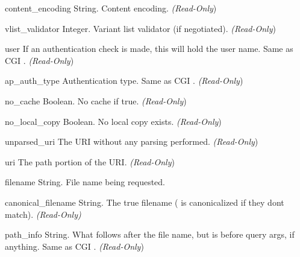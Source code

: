 \begin{memberdesc}[Request]{content_encoding}
String. Content encoding.
\emph{(Read-Only})
\end{memberdesc}

\begin{memberdesc}[Request]{vlist_validator}
Integer. Variant list validator (if negotiated).
\emph{(Read-Only})
\end{memberdesc}

\begin{memberdesc}[Request]{user}
If an authentication check is made, this will hold the user
name. Same as CGI .
\emph{(Read-Only})
\end{memberdesc}

\begin{memberdesc}[Request]{ap_auth_type}
Authentication type. Same as CGI .
\emph{(Read-Only})
\end{memberdesc}

\begin{memberdesc}[Request]{no_cache}
Boolean. No cache if true.
\emph{(Read-Only})
\end{memberdesc}

\begin{memberdesc}[Request]{no_local_copy}
Boolean. No local copy exists.
\emph{(Read-Only})
\end{memberdesc}

\begin{memberdesc}[Request]{unparsed_uri}
The URI without any parsing performed.
\emph{(Read-Only})
\end{memberdesc}

\begin{memberdesc}[Request]{uri}
The path portion of the URI.
\emph{(Read-Only})
\end{memberdesc}

\begin{memberdesc}[Request]{filename}
String. File name being requested.
\end{memberdesc}

\begin{memberdesc}[Request]{canonical_filename}
String. The true filename ( is canonicalized if
they dont match).  \emph{(Read-Only)}
\end{memberdesc}

\begin{memberdesc}[Request]{path_info}
String. What follows after the file name, but is before query args, if
anything. Same as CGI .
\emph{(Read-Only})
\end{memberdesc}

